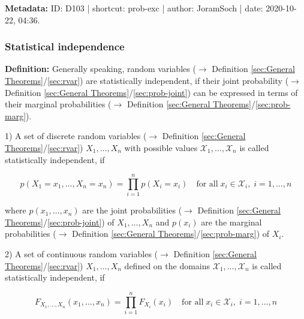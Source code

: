 \documentclass[a4paper,12pt,twoside]{book}
\begin{document}
\vspace{1em}
\textbf{Metadata:} ID: D103 | shortcut: prob-exc | author: JoramSoch | date: 2020-10-22, 04:36.
\vspace{1em}



\subsubsection[\textit{Statistical independence}]{Statistical independence} \label{sec:ind}
\setcounter{equation}{0}

\textbf{Definition:} Generally speaking, random variables ($\rightarrow$ Definition \ref{sec:General Theorems}/\ref{sec:rvar}) are statistically independent, if their joint probability ($\rightarrow$ Definition \ref{sec:General Theorems}/\ref{sec:prob-joint}) can be expressed in terms of their marginal probabilities ($\rightarrow$ Definition \ref{sec:General Theorems}/\ref{sec:prob-marg}).

\vspace{1em}
1) A set of discrete random variables ($\rightarrow$ Definition \ref{sec:General Theorems}/\ref{sec:rvar}) $X_1, \ldots, X_n$ with possible values $\mathcal{X}_1, \ldots, \mathcal{X}_n$ is called statistically independent, if

\begin{equation} \label{eq:ind-disc-ind}
p(X_1 = x_1, \ldots, X_n = x_n) = \prod_{i=1}^{n} p(X_i = x_i) \quad \text{for all} \; x_i \in \mathcal{X}_i, \; i = 1, \ldots, n
\end{equation}

where $p(x_1, \ldots, x_n)$ are the joint probabilities ($\rightarrow$ Definition \ref{sec:General Theorems}/\ref{sec:prob-joint}) of $X_1, \ldots, X_n$ and $p(x_i)$ are the marginal probabilities ($\rightarrow$ Definition \ref{sec:General Theorems}/\ref{sec:prob-marg}) of $X_i$.

\vspace{1em}
2) A set of continuous random variables ($\rightarrow$ Definition \ref{sec:General Theorems}/\ref{sec:rvar}) $X_1, \ldots, X_n$ defined on the domains $\mathcal{X}_1, \ldots, \mathcal{X}_n$ is called statistically independent, if

\begin{equation} \label{eq:ind-cont-ind-F}
F_{X_1,\ldots,X_n}(x_1,\ldots,x_n) = \prod_{i=1}^{n} F_{X_i}(x_i) \quad \text{for all} \; x_i \in \mathcal{X}_i, \; i = 1, \ldots, n
\end{equation}
\end{document}
